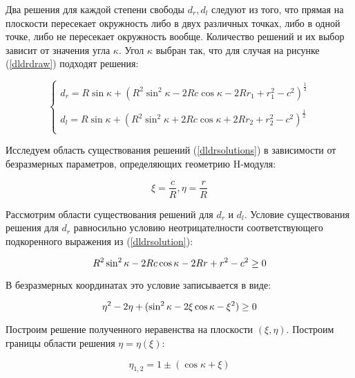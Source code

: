 Два решения для каждой степени свободы $d_r, d_l$ следуют из того, что прямая на плоскости пересекает окружность либо в двух различных точках, либо в одной точке, либо не пересекает окружность  вообще. Количество решений и их выбор зависит от значения угла $\kappa$. Угол $\kappa$ выбран так, что для случая на рисунке (\ref{dldrdraw}) подходят решения:

\begin{equation}
\left\{
\begin{array}{lcr}
d_r = R\sin{\kappa}+(R^2\sin^2{\kappa}-2Rc\cos{\kappa}-2Rr_1+r_1^2-c^2)^{\frac{1}{2}}\\
\\
d_l = R\sin{\kappa}+(R^2\sin^2{\kappa}+2Rc\cos{\kappa}+2Rr_2+r_2^2-c^2)^{\frac{1}{2}}\\
\end{array}
\right.
\label{dldrsolution}
\end{equation}

Исследуем область существования решений (\ref{dldrsolutions}) в зависимости от безразмерных параметров, определяющих геометрию H-модуля: 

$$
\xi = \dfrac{c}{R}, \eta = \dfrac{r}{R}
$$

Рассмотрим области существования решений для $d_r$ и $d_l$. Условие существования решения для $d_r$ равносильно условию неотрицателности соответствующего подкоренного выражения из (\ref{dldrsolution}):

\begin{equation}
R^2\sin^2{\kappa}-2Rc\cos{\kappa} -2Rr+r^2-c^2\geq0\\
\end{equation}

В безразмерных координатах это условие записывается в виде:

\begin{equation}
\eta^2-2\eta+(\sin^2{\kappa}-2\xi\cos{\kappa}-\xi^2)\geq0\\
\label{etaxi}
\end{equation}

Построим решение полученного неравенства на плоскости $(\xi,\eta)$. Построим границы области решения $\eta = \eta(\xi)$:

\begin{equation}
\eta_{1,2} = 1\pm(\cos{\kappa}+\xi)
\label{xietasolution}
\end{equation}

